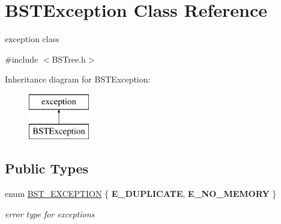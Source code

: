 \hypertarget{classBSTException}{\section{B\-S\-T\-Exception Class Reference}
\label{classBSTException}
}


exception class  




{\ttfamily \#include $<$B\-S\-Tree.\-h$>$}

Inheritance diagram for B\-S\-T\-Exception\-:\begin{figure}[H]
\begin{center}
\leavevmode
\includegraphics[height=2.000000cm]{classBSTException}
\end{center}
\end{figure}
\subsection*{Public Types}
\begin{DoxyCompactItemize}
\item 
enum \hyperlink{classBSTException_a4fffb763ca6b98d6b1329d546e76d8d8}{B\-S\-T\-\_\-\-E\-X\-C\-E\-P\-T\-I\-O\-N} \{ {\bfseries E\-\_\-\-D\-U\-P\-L\-I\-C\-A\-T\-E}, 
{\bfseries E\-\_\-\-N\-O\-\_\-\-M\-E\-M\-O\-R\-Y}
 \}
\begin{DoxyCompactList}\small\item\em error type for exceptions \end{DoxyCompactList}\end{DoxyCompactItemize}
